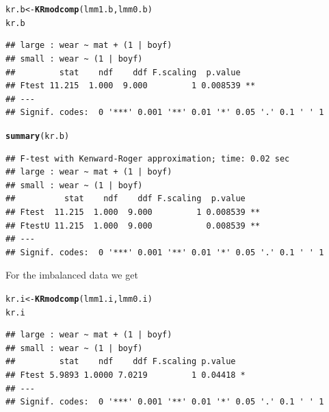 \documentclass[11pt]{article}\usepackage[]{graphicx}\usepackage[]{xcolor}
\makeatletter
\newcommand{\hlstd}[1]{\textcolor[rgb]{0.345,0.345,0.345}{#1}}%
\newcommand{\hlkwb}[1]{\textcolor[rgb]{0.69,0.353,0.396}{#1}}%
\newcommand{\hlkwd}[1]{\textcolor[rgb]{0.737,0.353,0.396}{\textbf{#1}}}%
\newenvironment{kframe}{%
 \def\at@end@of@kframe{}%
 \ifinner\ifhmode%
  \def\at@end@of@kframe{\end{minipage}}%
  \begin{minipage}{\columnwidth}%
 \fi\fi%
 \def\FrameCommand##1{\hskip\@totalleftmargin \hskip-\fboxsep
 \colorbox{shadecolor}{##1}\hskip-\fboxsep
     \hskip-\linewidth \hskip-\@totalleftmargin \hskip\columnwidth}%
 \MakeFramed {\advance\hsize-\width
   \@totalleftmargin\z@ \linewidth\hsize
   \@setminipage}}%
 {\par\unskip\endMakeFramed%
 \at@end@of@kframe}
\newenvironment{knitrout}{}{} %
\makeatother
\begin{document}
\begin{knitrout}
\color{fgcolor}\begin{kframe}
\begin{alltt}
\hlstd{kr.b} \hlkwb{<-} \hlkwd{KRmodcomp}\hlstd{(lmm1.b, lmm0.b)}
\hlstd{kr.b}
\end{alltt}
\begin{verbatim}
## large : wear ~ mat + (1 | boyf)
## small : wear ~ (1 | boyf)
##         stat    ndf    ddf F.scaling  p.value   
## Ftest 11.215  1.000  9.000         1 0.008539 **
## ---
## Signif. codes:  0 '***' 0.001 '**' 0.01 '*' 0.05 '.' 0.1 ' ' 1
\end{verbatim}
\end{kframe}
\end{knitrout}

\begin{knitrout}
\color{fgcolor}\begin{kframe}
\begin{alltt}
\hlkwd{summary}\hlstd{(kr.b)}
\end{alltt}
\begin{verbatim}
## F-test with Kenward-Roger approximation; time: 0.02 sec
## large : wear ~ mat + (1 | boyf)
## small : wear ~ (1 | boyf)
##          stat    ndf    ddf F.scaling  p.value   
## Ftest  11.215  1.000  9.000         1 0.008539 **
## FtestU 11.215  1.000  9.000           0.008539 **
## ---
## Signif. codes:  0 '***' 0.001 '**' 0.01 '*' 0.05 '.' 0.1 ' ' 1
\end{verbatim}
\end{kframe}
\end{knitrout}


For the imbalanced data we get
\begin{knitrout}
\color{fgcolor}\begin{kframe}
\begin{alltt}
\hlstd{kr.i} \hlkwb{<-} \hlkwd{KRmodcomp}\hlstd{(lmm1.i, lmm0.i)}
\hlstd{kr.i}
\end{alltt}
\begin{verbatim}
## large : wear ~ mat + (1 | boyf)
## small : wear ~ (1 | boyf)
##         stat    ndf    ddf F.scaling p.value  
## Ftest 5.9893 1.0000 7.0219         1 0.04418 *
## ---
## Signif. codes:  0 '***' 0.001 '**' 0.01 '*' 0.05 '.' 0.1 ' ' 1
\end{verbatim}
\end{kframe}
\end{knitrout}
\end{document}

